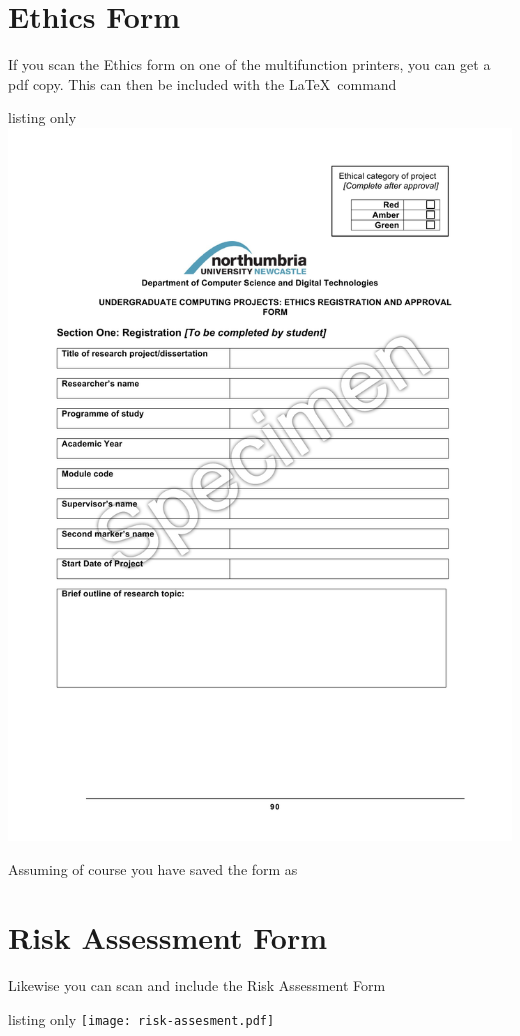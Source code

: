 \documentclass[12pt]{book}
\begin{document}
\section{Ethics Form}
If you scan the Ethics form on one of the multifunction printers, you can get a pdf copy.  This can then be included with the \LaTeX\ command
\begin{tcblisting}{listing only}
\includegraphics{ethics.pdf}
\end{tcblisting}
Assuming of course you have saved the form  as 

\section{Risk Assessment Form}
Likewise you can scan and include the Risk Assessment Form
\begin{tcblisting}{listing only}
\texttt{[image: risk-assesment.pdf]}
\end{tcblisting}
\end{document}
